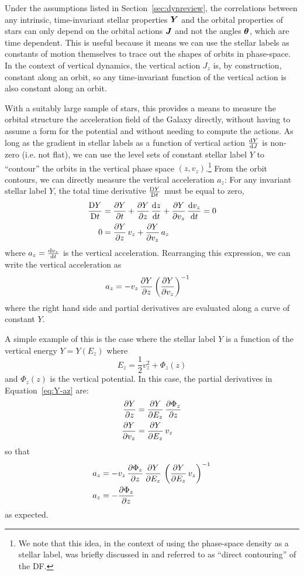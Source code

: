 Under the assumptions listed in Section~\ref{sec:dynreview}, the correlations between
any intrinsic, time-invariant stellar properties $\boldsymbol{Y}$ and the orbital properties of
stars can only depend on the orbital actions $\boldsymbol{J}$ and not the angles $\boldsymbol{\theta}$,
which are time dependent.
This is useful because it means we can use the stellar labels as constants of motion
themselves to trace out the shapes of orbits in phase-space.
In the context of vertical dynamics, the vertical action $J_z$ is, by construction,
constant along an orbit, so any time-invariant function of the vertical action is also
constant along an orbit.

With a suitably large sample of stars, this provides a means to measure the orbital
structure the acceleration field of the Galaxy directly, without having to assume a form
for the potential and without needing to compute the actions.
As long as the gradient in stellar labels as a function of vertical action
$\frac{\mathrm{d}{Y}}{\mathrm{d}{J}}$ is non-zero (i.e. not flat), we can use the level sets of constant
stellar label $Y$ to ``contour'' the orbits in the vertical phase space $(z,
v_z)$.\footnote{We note that this idea, in the context of using the phase-space density
as a stellar label, was briefly discussed in \citet{Kuijken:1989a} and referred to as
``direct contouring'' of the DF.}
From the orbit contours, we can directly measure the vertical acceleration $a_z$: For
any invariant stellar label $Y$, the total time derivative $\frac{\mathrm{D}{Y}}{\mathrm{D}{t}}$ must be equal
to zero,
\begin{align}
    \frac{\mathrm{D}{Y}}{\mathrm{D}{t}} &= \frac{\partial {Y}}{\partial {t}} +
        \frac{\partial {Y}}{\partial {z}} \, \frac{\mathrm{d}{z}}{\mathrm{d}{t}} + \frac{\partial {Y}}{\partial {v_z}} \, \frac{\mathrm{d}{v_z}}{\mathrm{d}{t}} = 0 \\
    0 &= \frac{\partial {Y}}{\partial {z}} \, v_z + \frac{\partial {Y}}{\partial {v_z}} \, a_z
\end{align}
where $a_z = \frac{\mathrm{d}{v_z}}{\mathrm{d}{t}}$ is the vertical acceleration.
Rearranging this expression, we can write the vertical acceleration as
\begin{align}
    a_z &= - v_z \, \frac{\partial {Y}}{\partial {z}} \left(\frac{\partial {Y}}{\partial {v_z}}\right)^{-1} \label{eq:Y-az}
\end{align}
where the right hand side and partial derivatives are evaluated along a curve of
constant $Y$.

A simple example of this is the case where the stellar label $Y$ is a function of the
vertical energy $Y=Y(E_z)$ where
\begin{equation}
    E_z = \frac{1}{2} v_z^2 + \Phi_z(z)
\end{equation}
and $\Phi_z(z)$ is the vertical potential.
In this case, the partial derivatives in Equation~\ref{eq:Y-az} are:
\begin{align}
    \frac{\partial {Y}}{\partial {z}} &= \frac{\partial {Y}}{\partial {E_z}} \, \frac{\partial {\Phi_z}}{\partial {z}}\\
    \frac{\partial {Y}}{\partial {v_z}} &= \frac{\partial {Y}}{\partial {E_z}} \, v_z
\end{align}
so that
\begin{align}
    a_z &= - v_z \, \frac{\partial {\Phi_z}}{\partial {z}} \, \frac{\partial {Y}}{\partial {E_z}} \, \left(\frac{\partial {Y}}{\partial {E_z}} \, v_z\right)^{-1} \\
    a_z &= - \frac{\partial {\Phi_z}}{\partial {z}}
\end{align}
as expected.

